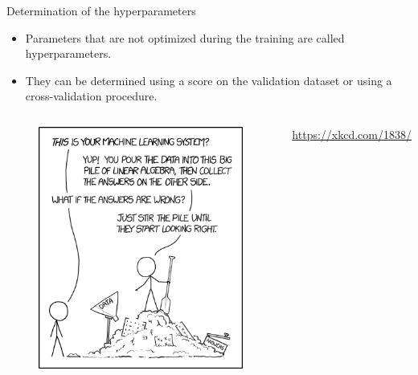 \documentclass[handout]{beamer}
\begin{document}
\begin{frame}{Determination of the hyperparameters}
    \begin{itemize}[<+->]
        \item Parameters that are not optimized during the training are called \alert{hyperparameters}.
        \item They can be determined using a score on the \alert{validation dataset} or using a \alert{cross-validation} procedure.
    \end{itemize}
    \pause
    \begin{columns}[b]
      \begin{figure}
       \centering
       \includegraphics[width=\textwidth]{fig/L2/machine_learning.png}
   \end{figure}
   \vfill
   {\footnotesize
   \url{https://xkcd.com/1838/}}
    \end{columns}

\end{frame}
\end{document}
